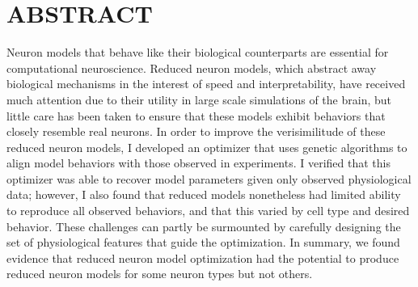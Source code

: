 \chapter*{ABSTRACT}

Neuron models that behave like their biological counterparts are essential for computational neuroscience.
Reduced neuron models, which abstract away biological mechanisms in the interest of speed and interpretability, have received much attention due to their utility in large scale simulations of the brain, but little care has been taken to ensure that these models exhibit behaviors that closely resemble real neurons.
In order to improve the verisimilitude of these reduced neuron models, I developed an optimizer that uses genetic algorithms to align model behaviors with those observed in experiments.
I verified that this optimizer was able to recover model parameters given only observed physiological data; however, I also found that reduced models nonetheless had limited ability to reproduce all observed behaviors, and that this varied by cell type and desired behavior.
These challenges can partly be surmounted by carefully designing the set of physiological features that guide the optimization. In summary, we found evidence that reduced neuron model optimization had the potential to produce reduced neuron models for some neuron types but not others.












